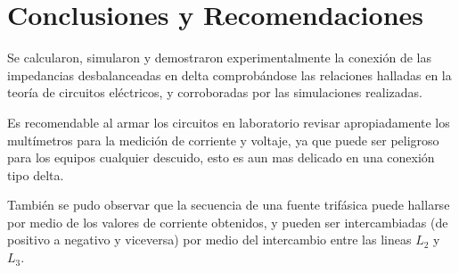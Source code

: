 \documentclass[letter,11pt]{article}
\begin{document}
\section{Conclusiones y Recomendaciones}
Se calcularon, simularon y demostraron experimentalmente la conexión de las
impedancias desbalanceadas en delta comprobándose las relaciones halladas en la
teoría de circuitos eléctricos, y corroboradas por las simulaciones realizadas.

Es recomendable al armar los circuitos en laboratorio revisar apropiadamente los
multímetros para la medición de corriente y voltaje, ya que puede ser peligroso
para los equipos cualquier descuido, esto es aun mas delicado en una conexión
tipo delta.

También se pudo observar que la secuencia de una fuente trifásica puede hallarse
por medio de los valores de corriente obtenidos, y pueden ser intercambiadas
(de positivo a negativo y viceversa) por medio del intercambio entre las lineas
$L_2$ y $L_3$.
\end{document}
